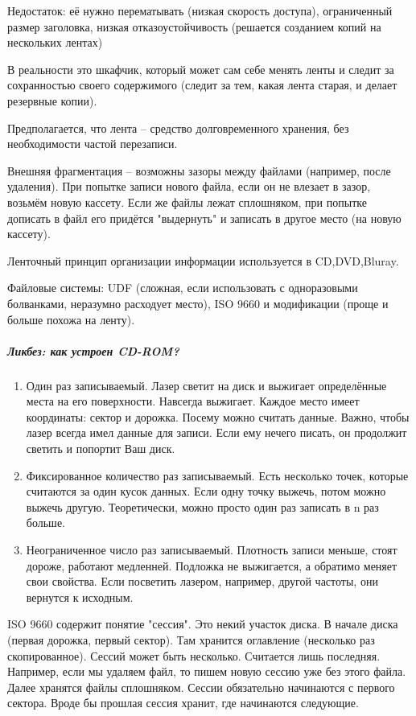 \documentclass[a4paper,10pt]{article}
\begin{document}
Недостаток: её нужно перематывать (низкая скорость доступа), ограниченный размер заголовка, низкая отказоустойчивость (решается созданием копий на нескольких лентах)

В реальности это шкафчик, который может сам себе менять ленты и следит за сохранностью своего содержимого (следит за тем, какая лента старая, и делает резервные копии).

Предполагается, что лента -- средство долговременного хранения, без необходимости частой перезаписи.

Внешняя фрагментация -- возможны зазоры между файлами (например, после удаления). 
При попытке записи нового файла, если он не влезает в зазор, возьмём новую кассету. 
Если же файлы лежат сплошняком, при попытке дописать в файл его придётся "выдернуть" и записать в другое место (на новую кассету).

Ленточный принцип организации информации используется в CD,DVD,Bluray. 

Файловые системы: UDF (сложная, если использовать с одноразовыми болванками, неразумно расходует место), ISO 9660 и модификации (проще и больше похожа на ленту).

\subparagraph{Ликбез: как устроен CD-ROM?}
\begin{enumerate}
 \item Один раз записываемый. 
 Лазер светит на диск и выжигает определённые места на его поверхности. Навсегда выжигает. Каждое место имеет координаты: сектор и дорожка. Посему можно считать данные.
 Важно, чтобы лазер всегда имел данные для записи. Если ему нечего писать, он продолжит светить и попортит Ваш диск.
 \item Фиксированное количество раз записываемый. Есть несколько точек, которые считаются за один кусок данных. Если одну точку выжечь, потом можно выжечь другую.
 Теоретически, можно просто один раз записать в n раз больше.
 \item Неограниченное число раз записываемый. Плотность записи меньше, стоят дороже, работают медленней.
 Подложка не выжигается, а обратимо меняет свои свойства. Если посветить лазером, например, другой частоты, они вернутся к исходным.
\end{enumerate}

ISO 9660 содержит понятие "сессия". Это некий участок диска. В начале диска (первая дорожка, первый сектор). Там хранится оглавление (несколько раз скопированное). 
Сессий может быть несколько. Считается лишь последняя. Например, если мы удаляем файл, то пишем новую сессию уже без этого файла. Далее хранятся файлы сплошняком.
Сессии обязательно начинаются с первого сектора. Вроде бы прошлая сессия хранит, где начинаются следующие.
\end{document}
